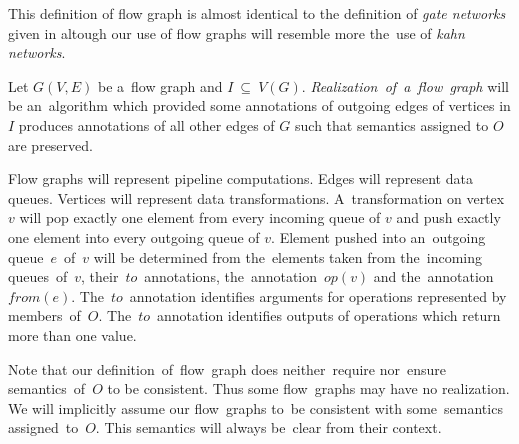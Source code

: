 This definition of flow graph is almost identical to the definition of \emph{gate networks} given in \cite{ads} altough our use of flow graphs will resemble more the~use of \emph{kahn networks}.

\begin{define}
  Let $G(V,E)$ be a~flow graph and $I~\subseteq~V(G)$. \emph{Realization~of~a~flow~graph} will be an~algorithm which provided some annotations of outgoing edges of vertices in $I$ produces annotations of all other edges of $G$ such that semantics assigned to $O$ are preserved. 
\end{define}

Flow graphs will represent pipeline computations. Edges will represent data queues. Vertices will represent data transformations. A~transformation on vertex~$v$ will pop exactly one element from every incoming queue of $v$ and push exactly one element into every outgoing queue of $v$. Element pushed into an~outgoing queue~$e$~of~$v$ will be determined from the~elements taken from the~incoming queues~of~$v$, their~$to$~annotations, the~annotation~$op(v)$ and the~annotation~$from(e)$. The~$to$~annotation identifies arguments for operations represented by members~of~$O$. The~$to$~annotation identifies outputs of operations which return more than one value.

\parspace

Note that our definition~of~flow~graph does neither~require nor~ensure semantics~of~$O$ to be consistent. Thus some flow~graphs may have no realization. We will implicitly assume our flow~graphs to~be consistent with some~semantics assigned~to~$O$. This semantics will always be~clear from their context.

